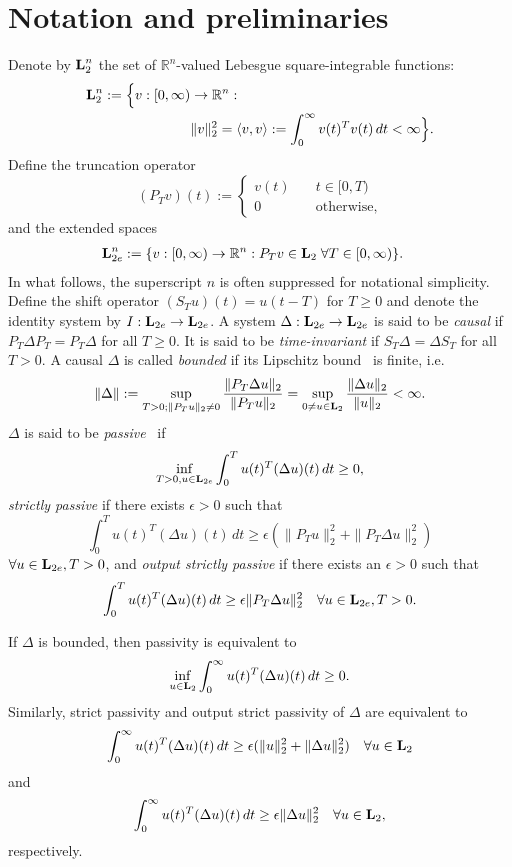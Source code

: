 \documentclass{ifacconf}
\def\Real{\mathbb{R}} \def\Ints{\mathbb{Z}} \def\Natural{\mathbb{N}}
\newcommand{\Ltwo}{\boldsymbol{\rm L}_{2}}
\newcommand{\Ltwoe}{\boldsymbol{\rm L}_{2e}}
\theoremstyle{definition}
\begin{document}
\section{Notation and preliminaries}

Denote by $\Ltwo^n$ the set of $\Real^n$-valued Lebesgue square-integrable functions:
\begin{align*}
\Ltwo^n := \Big\{v : [0, \infty) & \to \Real^n : \\
& \|v\|_2^2 = \langle v, v \rangle := \int_0^\infty v(t)^Tv(t) \, dt < \infty\Big\}.
\end{align*}
Define the truncation operator
\[
(P_Tv)(t) := \left\{\begin{array}{ll}
v(t) & \quad t \in [0, T) \\
0 & \quad \text{otherwise},
\end{array} \right.
\]
and the extended spaces
\begin{align*}
 \Ltwoe^n & := \{v : [0, \infty) \to \Real^n : P_Tv \in \Ltwo \; \forall T \in [0, \infty)\}.
\end{align*}
In what follows, the superscript $n$ is often suppressed for notational simplicity.  Define the shift operator $(S_T u)(t) = u(t - T)$ for $T \geq 0$
and denote the identity system by $I : \Ltwoe \to \Ltwoe$.  A system $\Delta : \Ltwoe \to \Ltwoe$ is said to be \emph{causal} if
$P_T \Delta P_T = P_T\Delta$ for all $T \geq 0$. It is said to be \emph{time-invariant} if $S_T \Delta = \Delta S_T$ for all $T > 0$. A causal
$\Delta$ is called \emph{bounded} if its Lipschitz bound~\cite[Section 2.4]{Wil71} is finite, i.e.
\begin{align*} %
\|\Delta\| := \sup_{T > 0; \|P_Tu\|_2 \neq 0} \frac{\|P_T \Delta u\|_2}{\|P_T u\|_2} = \sup_{0 \neq u \in \Ltwo} \frac{\|\Delta u\|_2}{\|u\|_2} < \infty.
\end{align*}
$\Delta$ is said to be \emph{passive}~\citep{Wil72, Sch16} if
\begin{align} \label{eq: passive}
\inf_{T > 0, u \in \Ltwoe} \int_0^T u(t)^T (\Delta u)(t) \, dt \geq 0,
\end{align}
\emph{strictly passive} if there exists $\epsilon > 0$ such that
\[
\int_0^T u(t)^T (\Delta u)(t) \, dt \geq \epsilon (\|P_T u\|_2^2 + \|P_T \Delta u\|_2^2)
\]
$\forall u \in \Ltwoe, T >0$, and \emph{output strictly passive} if there exists an $\epsilon > 0$ such that
\[
\int_0^T u(t)^T (\Delta u)(t) \, dt \geq \epsilon \|P_T \Delta u\|_2^2 \quad \forall u \in \Ltwoe, T >0.
\]

\begin{lem} \label{lem: passive}
If $\Delta$ is bounded, then passivity is equivalent to 
\begin{align} \label{eq: bounded_passive}
\inf_{u \in \Ltwo} \int_0^\infty u(t)^T (\Delta u)(t) \, dt \geq 0.
\end{align}
Similarly, strict passivity and output strict passivity of $\Delta$ are equivalent to
\[
\int_0^\infty u(t)^T (\Delta u)(t) \, dt \geq \epsilon (\|u\|_2^2 + \|\Delta u\|_2^2) \quad \forall u \in \Ltwo
\]
and
\[
\int_0^\infty u(t)^T (\Delta u)(t) \, dt \geq \epsilon \|\Delta u\|_2^2 \quad \forall u \in \Ltwo,
\]
respectively.
\end{lem}
\end{document}
